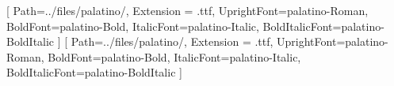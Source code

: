 \usepackage{fontspec}

\setsansfont{Palatino Linotype}[
    Path=../files/palatino/,
    Extension = .ttf,
    UprightFont=palatino-Roman,
    BoldFont=palatino-Bold,
    ItalicFont=palatino-Italic,
    BoldItalicFont=palatino-BoldItalic
]
\setmainfont{Palatino Linotype}[
    Path=../files/palatino/,
    Extension = .ttf,
    UprightFont=palatino-Roman,
    BoldFont=palatino-Bold,
    ItalicFont=palatino-Italic,
    BoldItalicFont=palatino-BoldItalic
]

\usepackage[textwidth=0.86\paperwidth, textheight=0.86\paperheight]{geometry}
\usepackage{fancyhdr}
\usepackage{hyperref}
\usepackage{fontawesome5}
\usepackage{graphicx}
\usepackage{amssymb}
\usepackage{amsmath}
\graphicspath{{../files/}}

\newcommand{\R}{\mathbb{R}}

\pagestyle{fancy}
\fancyhead{} %
